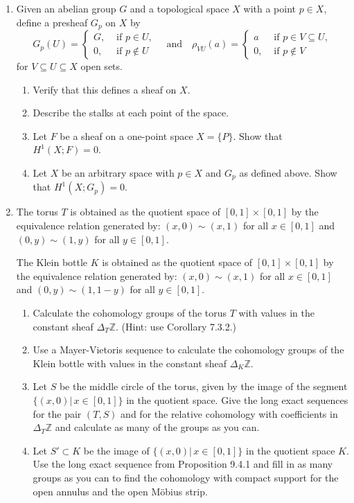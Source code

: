 \documentclass{article}
\newcommand{\zed}{\mathbb Z}
\begin{document}
\begin{enumerate}
\item 
Given an abelian group $G$ and a topological space $X$ with a point $p\in X$, define a presheaf $G_p$ on $X$ by
$$
G_p(U)=\left\{\begin{array}{ll}G,&\mbox{ if }p\in U,\\0,&\mbox{ if }p\not\in U\end{array}\right.
\quad \mbox{and}\quad \rho_{VU}(a)=\left\{\begin{array}{ll}a&\mbox{ if }p\in V\subseteq U,\\
                                                                                                                                           0,&\mbox{ if }p\not\in V
                                                                                                                                          \end{array}\right.
$$
for $V\subseteq U\subseteq X$ open sets. 
\begin{enumerate}
\item Verify that this defines a sheaf on $X$. 
\item Describe the stalks at each point of the space.
\item Let $F$ be a sheaf on a one-point space $X=\{P\}$. Show that $H^1(X;F)=0$.
\item Let $X$ be an arbitrary space with $p\in X$ and $G_p$ as defined above.
Show that $H^1(X;G_p)=0$.
\end{enumerate}

\item
The torus $T$ is obtained as the quotient space of $[0,1]\times[0,1]$ by the equivalence relation generated by: 
$(x,0)\sim (x,1)$ for all $x\in [0,1]$ and $(0,y)\sim(1,y)$ for all $y\in [0,1]$.

The Klein bottle $K$ is obtained as the quotient space of $[0,1]\times[0,1]$ by the equivalence relation generated by: 
$(x,0)\sim (x,1)$ for all $x\in [0,1]$ and $(0,y)\sim(1,1-y)$ for all $y\in [0,1]$.
\begin{enumerate}
\item
Calculate the cohomology groups of the torus $T$ with values in the constant sheaf $\Delta_T\zed$. (Hint: use Corollary 7.3.2.)
\item
Use a Mayer-Vietoris sequence to calculate the cohomology groups of the Klein bottle with values in the constant sheaf $\Delta_K\zed$. 
\item
Let $S$ be the middle circle of the torus, given by the image of the segment $\{(x,0)|\,x\in[0,1]\}$ in the quotient space. Give the long exact sequences for the pair $(T,S)$ 
and for the relative cohomology with coefficients in $\Delta_T\zed$ and calculate as many of the groups as you can.
\item
Let $S'\subset K$ be the image of $\{(x,0)|\,x\in[0,1]\}$ in the quotient space $K$.
Use the long exact sequence from Proposition 9.4.1 and fill in as many groups as you can to find the cohomology with compact support for 
the open annulus and the open M\"obius strip.
\end{enumerate}


\end{enumerate}
\end{document}
